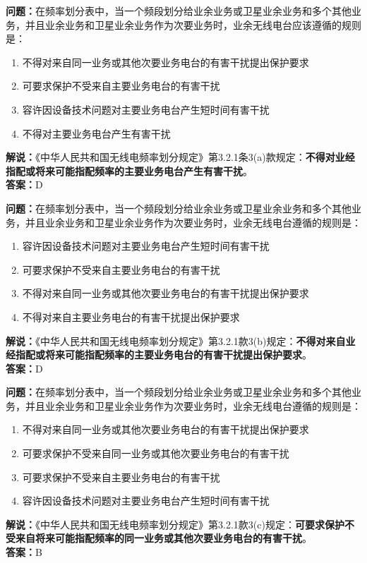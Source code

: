 \documentclass{ctexbook}
\begin{document}
\bigskip


\noindent\textbf{问题：}在频率划分表中，当一个频段划分给业余业务或卫星业余业务和多个其他业务，并且业余业务和卫星业余业务作为次要业务时，业余无线电台应该遵循的规则是：
\begin{enumerate}[label=\Alph*), leftmargin=3em]
	\item 不得对来自同一业务或其他次要业务电台的有害干扰提出保护要求
	\item 可要求保护不受来自主要业务电台的有害干扰
	\item 容许因设备技术问题对主要业务电台产生短时间有害干扰
	\item 不得对主要业务电台产生有害干扰
\end{enumerate}
\noindent\textbf{解说：}《中华人民共和国无线电频率划分规定》第3.2.1条3(a)款规定：\textbf{不得对业经指配或将来可能指配频率的主要业务电台产生有害干扰}。\\
\textbf{答案：}D




\bigskip


\noindent\textbf{问题：}在频率划分表中，当一个频段划分给业余业务或卫星业余业务和多个其他业务，并且业余业务和卫星业余业务作为次要业务时，业余无线电台遵循的规则是：
\begin{enumerate}[label=\Alph*), leftmargin=3em]
	\item 容许因设备技术问题对主要业务电台产生短时间有害干扰
	\item 可要求保护不受来自主要业务电台的有害干扰
	\item 不得对来自同一业务或其他次要业务电台的有害干扰提出保护要求
	\item 不得对来自主要业务电台的有害干扰提出保护要求
\end{enumerate}
\noindent\textbf{解说：}《中华人民共和国无线电频率划分规定》第3.2.1款3(b)规定：\textbf{不得对来自业经指配或将来可能指配频率的主要业务电台的有害干扰提出保护要求}。\\\textbf{答案：}D




\bigskip


\noindent\textbf{问题：}在频率划分表中，当一个频段划分给业余业务或卫星业余业务和多个其他业务，并且业余业务和卫星业余业务作为次要业务时，业余无线电台遵循的规则是：
\begin{enumerate}[label=\Alph*), leftmargin=3em]
	\item 不得对来自同一业务或其他次要业务电台的有害干扰提出保护要求
	\item 可要求保护不受来自同一业务或其他次要业务电台的有害干扰
	\item 可要求保护不受来自主要业务电台的有害干扰
	\item 容许因设备技术问题对主要业务电台产生短时间有害干扰
\end{enumerate}
\noindent\textbf{解说：}《中华人民共和国无线电频率划分规定》第3.2.1款3(c)规定：\textbf{可要求保护不受来自将来可能指配频率的同一业务或其他次要业务电台的有害干扰}。\\
\textbf{答案：}B
\end{document}
